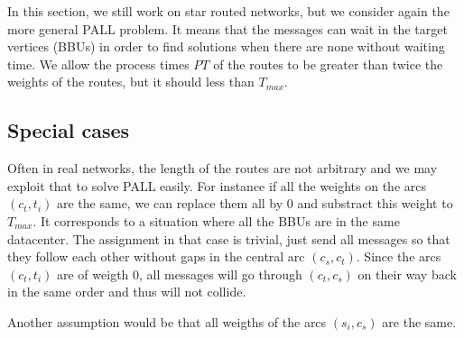 \documentclass[10pt, conference, letterpaper]{IEEEtran}
\begin{document}
    In this section, we still work on star routed networks, but we consider again the more general PALL problem. It means that the messages can wait in the target vertices (BBUs) in order to find solutions when there are none without waiting time. We allow the process times $PT$ of the routes to be greater than twice the weights of the routes, but it should less than $T_{max}$.

	\subsection{Special cases}
		
		
	Often in real networks, the length of the routes are not arbitrary and we may exploit that to solve PALL easily. For instance if all the weights on the arcs $(c_t,t_i)$ are the same, we can replace them all by $0$ and substract this weight to $T_{max}$. It corresponds to a situation where all the BBUs are in the same datacenter.
	The assignment in that case is trivial, just send all messages so that they follow each other without gaps in the central arc $(c_s,c_t)$. Since the arcs $(c_t,t_i)$ are of weigth $0$, all messages will go through $(c_t,c_s)$ on their way back in
	the same order and thus will not collide. 
	
	Another assumption would be that all weigths of the arcs $(s_i,c_s)$ are the same.
	
\end{document}
